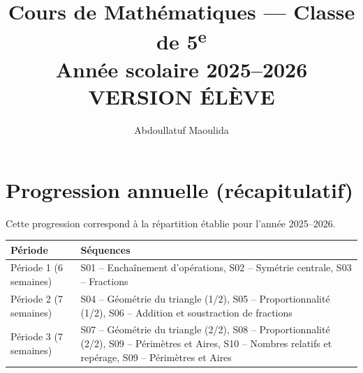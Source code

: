 \documentclass[12pt,a4paper]{book}
\title{Cours de Mathématiques — Classe de 5\textsuperscript{e}\\[0.4em]
\large Année scolaire 2025–2026\\[0.3em]
\normalsize VERSION ÉLÈVE}
\author{Abdoullatuf Maoulida}
\begin{document}
\maketitle
\tableofcontents
\cleardoublepage



\cleardoublepage
\appendix
\chapter{Progression annuelle (récapitulatif)}
Cette progression correspond à la répartition établie pour l'année 2025–2026.

\begin{center}
\begin{tabular}{|l|l|}
\hline
\textbf{Période} & \textbf{Séquences}\\ \hline
Période 1 (6 semaines) & S01 -- Enchaînement d'opérations, S02 -- Symétrie centrale, S03 -- Fractions\\ \hline
Période 2 (7 semaines) & S04 -- Géométrie du triangle (1/2), S05 -- Proportionnalité (1/2), S06 -- Addition et soustraction de fractions\\ \hline
Période 3 (7 semaines) & S07 -- Géométrie du triangle (2/2), S08 -- Proportionnalité (2/2), S09 -- Périmètres et Aires, S10 -- Nombres relatifs et repérage, S09 -- Périmètres et Aires\\ \hline
\end{tabular}
\end{center}
\end{document}
